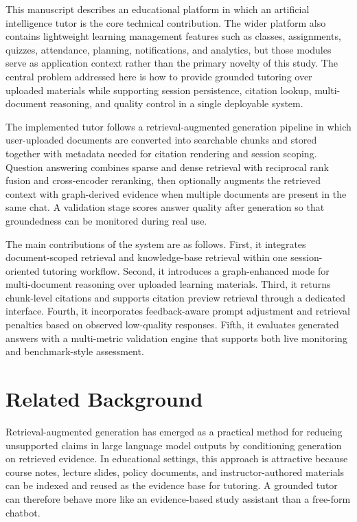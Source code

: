 \documentclass[11pt,a4paper]{article}
\begin{document}
This manuscript describes an educational platform in which an artificial intelligence tutor is the core technical contribution. The wider platform also contains lightweight learning management features such as classes, assignments, quizzes, attendance, planning, notifications, and analytics, but those modules serve as application context rather than the primary novelty of this study. The central problem addressed here is how to provide grounded tutoring over uploaded materials while supporting session persistence, citation lookup, multi-document reasoning, and quality control in a single deployable system.

The implemented tutor follows a retrieval-augmented generation pipeline in which user-uploaded documents are converted into searchable chunks and stored together with metadata needed for citation rendering and session scoping. Question answering combines sparse and dense retrieval with reciprocal rank fusion and cross-encoder reranking, then optionally augments the retrieved context with graph-derived evidence when multiple documents are present in the same chat. A validation stage scores answer quality after generation so that groundedness can be monitored during real use.

The main contributions of the system are as follows. First, it integrates document-scoped retrieval and knowledge-base retrieval within one session-oriented tutoring workflow. Second, it introduces a graph-enhanced mode for multi-document reasoning over uploaded learning materials. Third, it returns chunk-level citations and supports citation preview retrieval through a dedicated interface. Fourth, it incorporates feedback-aware prompt adjustment and retrieval penalties based on observed low-quality responses. Fifth, it evaluates generated answers with a multi-metric validation engine that supports both live monitoring and benchmark-style assessment.

\section{Related Background}

Retrieval-augmented generation has emerged as a practical method for reducing unsupported claims in large language model outputs by conditioning generation on retrieved evidence. In educational settings, this approach is attractive because course notes, lecture slides, policy documents, and instructor-authored materials can be indexed and reused as the evidence base for tutoring. A grounded tutor can therefore behave more like an evidence-based study assistant than a free-form chatbot.
\end{document}
